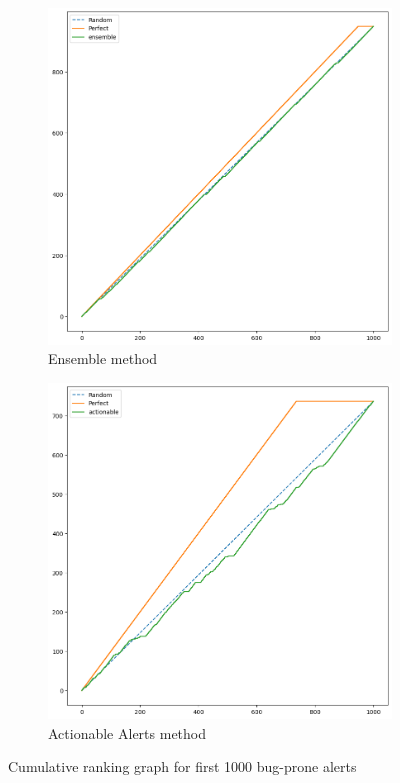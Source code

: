 \begin{figure}[H]
	\begin{subfigure}{.5\textwidth}
		\centering
		\includegraphics[scale=0.3]{./src/ensemble/ensemble_buggy_cumulative_graph_top1000.png}
		\caption{Ensemble method}\label{}
	\end{subfigure}%
	\begin{subfigure}{.5\textwidth}
		\centering
		\includegraphics[scale=0.3]{./src/ensemble/actionable_buggy_cumulative_graph_top1000.png}
		\caption{Actionable Alerts method}
	\end{subfigure}
	\caption{Cumulative ranking graph for first 1000 bug-prone alerts}
	\label{results:ensemble_bugprone}
\end{figure}


